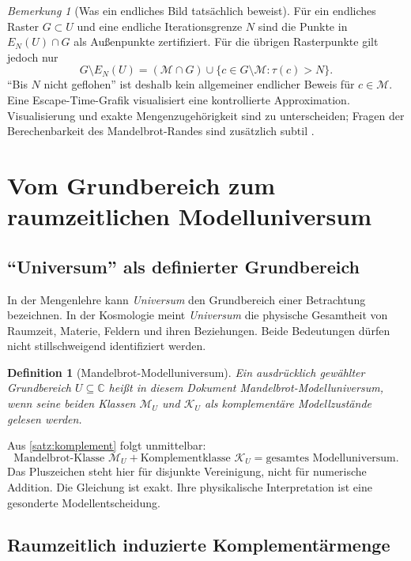\documentclass[11pt,a4paper]{article}
\newtheorem{definition}{Definition}[section]
\theoremstyle{remark}
\newtheorem{bemerkung}{Bemerkung}[section]
\newcommand{\M}{\mathcal{M}}
\newcommand{\K}{\mathcal{K}}
\newcommand{\C}{\mathbb{C}}
\begin{document}
\begin{bemerkung}[Was ein endliches Bild tatsächlich beweist]
Für ein endliches Raster \(G\subset U\) und eine endliche Iterationsgrenze
\(N\) sind die Punkte in \(E_N(U)\cap G\) als Außenpunkte zertifiziert. Für
die übrigen Rasterpunkte gilt jedoch nur
\[
G\setminus E_N(U)
=
(\M\cap G)
\cup
\{c\in G\setminus\M:\tau(c)>N\}.
\]
``Bis \(N\) nicht geflohen'' ist deshalb kein allgemeiner endlicher Beweis
für \(c\in\M\). Eine Escape-Time-Grafik visualisiert eine kontrollierte
Approximation. Visualisierung und exakte Mengenzugehörigkeit sind zu
unterscheiden; Fragen der Berechenbarkeit des Mandelbrot-Randes sind
zusätzlich subtil \citep{hertling2005}.
\end{bemerkung}

\section{Vom Grundbereich zum raumzeitlichen Modelluniversum}
\label{sec:modeluniversum}

\subsection{``Universum'' als definierter Grundbereich}

In der Mengenlehre kann \emph{Universum} den Grundbereich einer Betrachtung
bezeichnen. In der Kosmologie meint \emph{Universum} die physische Gesamtheit
von Raumzeit, Materie, Feldern und ihren Beziehungen. Beide Bedeutungen dürfen
nicht stillschweigend identifiziert werden.

\begin{definition}[Mandelbrot-Modelluniversum]
Ein ausdrücklich gewählter Grundbereich \(U\subseteq\C\) heißt in diesem
Dokument \emph{Mandelbrot-Modelluniversum}, wenn seine beiden Klassen
\(\M_U\) und \(\K_U\) als komplementäre Modellzustände gelesen werden.
\end{definition}

Aus \cref{satz:komplement} folgt unmittelbar:
\[
  \boxed{\text{Mandelbrot-Klasse }\M_U+
  \text{Komplementklasse }\K_U
  =\text{gesamtes Modelluniversum}.}
\]
Das Pluszeichen steht hier für disjunkte Vereinigung, nicht für numerische
Addition. Die Gleichung ist exakt. Ihre physikalische Interpretation ist eine
gesonderte Modellentscheidung.

\subsection{Raumzeitlich induzierte Komplementärmenge}
\end{document}
